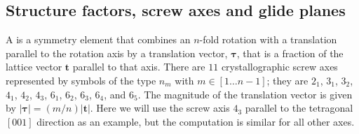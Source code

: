 \subsection{Structure factors, screw axes and glide planes}\label{\chabbr:ssec:SFscrewglide}
A  is a symmetry element that combines an $n$-fold rotation with a translation parallel to the rotation axis by a translation vector, $\bm{\tau}$, that is a fraction of the lattice vector $\mathbf{t}$ parallel to that axis.  There are $11$ crystallographic screw axes represented by symbols of the type $n_m$ with $m\in[1\ldots n-1]$; they are $2_1$, $3_1$, $3_2$, $4_1$, $4_2$, $4_3$, $6_1$, $6_2$, $6_3$, $6_4$, and $6_5$. The magnitude of the translation vector is given by $\vert\bm{\tau}\vert=(m/n)\vert\mathbf{t}\vert$. Here we will use the screw axis $4_3$ parallel to the tetragonal $[001]$ direction as an example, but the computation is similar for all other axes.

